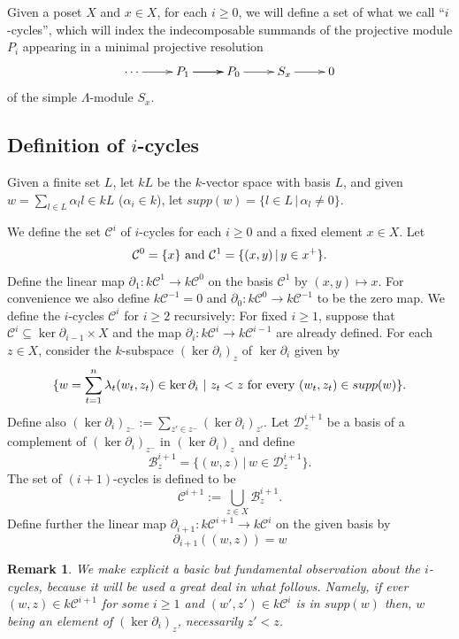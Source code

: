\documentclass[preprint,review,12pt]{elsarticle}
\newcommand{\C}{{\mathcal C}}
\newcommand{\B}{{\mathcal B}}
\newtheorem{obs}[deft]{Remark}
\begin{document}
\medskip 

Given a poset $X$ and $x\in X$, for each $i\geqslant 0$, we will define a set of what we call ``$i$-cycles'', which will index the indecomposable summands of the projective module $P_i$ appearing in a minimal projective resolution
$$\xymatrix@R=0.8em{ \cdots\ar[r]& \ar[r] P_1 \ar[r] & P_0 \ar[r] & S_x \ar[r] & 0}$$
of the simple $\Lambda$-module $S_x$.


\subsection{Definition of $i$-cycles}\label{subsec icycle def}
Given a finite set $L$, let $kL$ be the $k$-vector space with basis $L$, and given $w = \sum_{l\in L}\alpha_ll\in kL$ ($\alpha_i\in k$), let $supp(w) = \{l\in L\,|\,\alpha_l\neq 0\}$.  

We define the set $\C^i$ of $i$-cycles for each $i \geqslant 0$ and a fixed element $x \in X$. Let 
	$$\C^{0}=\{x\}\hbox{ and }\C^{1} = \{(x,y)\,|\,y\in x^+\}.$$  
Define the linear map $\partial_{1} : k\C^{1}\to k\C^{0}$ on the basis $\C^{1}$ by $(x,y)\mapsto x$. For convenience we also define $k\C^{-1} = 0$ and $\partial_{0} : k\C^{0}\to k\C^{-1}$ to be the zero map. We define the $i$-cycles $\C^i$ for $i\geqslant 2$ recursively: For fixed $i\geqslant 1$, suppose that $\C^i\subseteq \ker\partial_{i-1}\times X$ and the map $\partial_i : k\C^i\to k\C^{i-1}$ are already defined. For each $z\in X$, consider the $k$-subspace $(\ker\partial_{i})_z$	of $\ker\partial_{i}$ given by 
	$$\{w=\sum_{t=1}^n \lambda_t(w_t,z_t)\in \ker\partial_{i}\ |\ z_t < z \textnormal{ for every } (w_t,z_t)\in supp(w) \}.$$
Define also $(\ker\partial_{i})_{z^-}:=\sum_{z'\in z^-}(\ker\partial_{i})_{z'}$. Let ${\mathcal{D}^{i+1}_z}$ be a basis of a complement of $(\ker\partial_{i})_{z^-}$ in $(\ker\partial_{i})_{z}$ and define 
	$$\B^{i+1}_z = \{(w,z)\,|\,w\in {\mathcal{D}^{i+1}_z}\}.$$ 
The set of $(i+1)$-cycles is defined to be
	$$\C^{i+1}:=\bigcup_{z\in X}\B^{i+1}_z.$$
Define further the linear map $\partial_{i+1}:k\C^{i+1}\rightarrow k\C^i$ on the given basis by 
	$$\partial_{i+1}((w,z))=w$$

\begin{obs}\label{obs z' are less than z}
We make explicit a basic but fundamental observation about the $i$-cycles, because it will be used a great deal in what follows.  Namely, if ever $(w,z)\in k\mathcal{C}^{i+1}$ for some $i\geqslant 1$  and $(w',z')\in k\mathcal{C}^i$ is in $supp(w)$ then, $w$ being an element of $(\ker\partial_{i})_z$, necessarily $z'<z$.
\end{obs}
    
\end{document}
